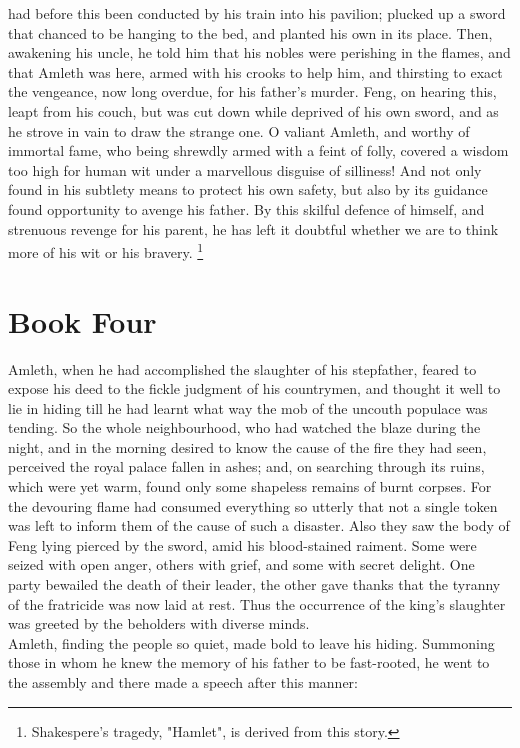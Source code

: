 \documentclass[10pt,a4paper]{report}
\begin{document}
had before this been conducted by his train into his pavilion; plucked up a sword that chanced to be hanging to the bed, and planted his own in its place. Then, awakening his uncle, he told him that his nobles were perishing in the flames, and that Amleth was here, armed with his crooks to help him, and thirsting to exact the vengeance, now long overdue, for his father's murder. Feng, on hearing this, leapt from his couch, but was cut down while deprived of his own sword, and as he strove in vain to draw the strange one. O valiant Amleth, and worthy of immortal fame, who being shrewdly armed with a feint of folly, covered a wisdom too high for human wit under a marvellous disguise of silliness! And not only found in his subtlety means to protect his own safety, but also by its guidance found opportunity to avenge his father. By this skilful defence of himself, and strenuous revenge for his parent, he has left it doubtful whether we are to think more of his wit or his bravery. \footnote{Shakespere's tragedy, "Hamlet", is derived from this story.}\\


\chapter{Book Four}

Amleth, when he had accomplished the slaughter of his stepfather, feared to expose his deed to the fickle judgment of his countrymen, and thought it well to lie in hiding till he had learnt what way the mob of the uncouth populace was tending. So the whole neighbourhood, who had watched the blaze during the night, and in the morning desired to know the cause of the fire they had seen, perceived the royal palace fallen in ashes; and, on searching through its ruins, which were yet warm, found only some shapeless remains of burnt corpses. For the devouring flame had consumed everything so utterly that not a single token was left to inform them of the cause of such a disaster. Also they saw the body of Feng lying pierced by the sword, amid his blood-stained raiment. Some were seized with open anger, others with grief, and some with secret delight. One party bewailed the death of their leader, the other gave thanks that the tyranny of the fratricide was now laid at rest. Thus the occurrence of the king's slaughter was greeted by the beholders with diverse minds.\\

Amleth, finding the people so quiet, made bold to leave his hiding. Summoning those in whom he knew the memory of his father to be fast-rooted, he went to the assembly and there made a speech after this manner:\\
\end{document}
